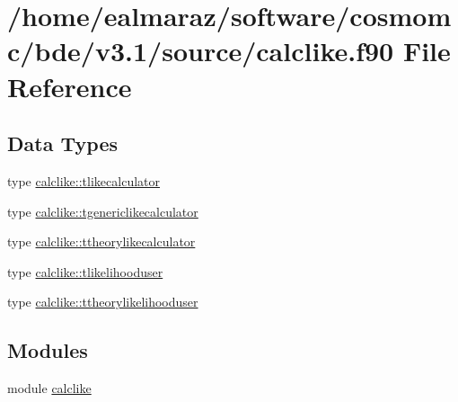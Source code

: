 \hypertarget{calclike_8f90}{}\section{/home/ealmaraz/software/cosmomc/bde/v3.1/source/calclike.f90 File Reference}
\label{calclike_8f90}
\subsection*{Data Types}
\begin{DoxyCompactItemize}
\item 
type \mbox{\hyperlink{structcalclike_1_1tlikecalculator}{calclike\+::tlikecalculator}}
\item 
type \mbox{\hyperlink{structcalclike_1_1tgenericlikecalculator}{calclike\+::tgenericlikecalculator}}
\item 
type \mbox{\hyperlink{structcalclike_1_1ttheorylikecalculator}{calclike\+::ttheorylikecalculator}}
\item 
type \mbox{\hyperlink{structcalclike_1_1tlikelihooduser}{calclike\+::tlikelihooduser}}
\item 
type \mbox{\hyperlink{structcalclike_1_1ttheorylikelihooduser}{calclike\+::ttheorylikelihooduser}}
\end{DoxyCompactItemize}
\subsection*{Modules}
\begin{DoxyCompactItemize}
\item 
module \mbox{\hyperlink{namespacecalclike}{calclike}}
\end{DoxyCompactItemize}
